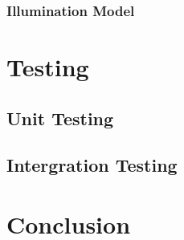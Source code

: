 \documentclass{cmppgr}
\begin{document}
\subsubsection{Illumination Model}

\section{Testing}

\subsection{Unit Testing}

\subsection{Intergration Testing}

\section{Conclusion}




%

%
\end{document}
